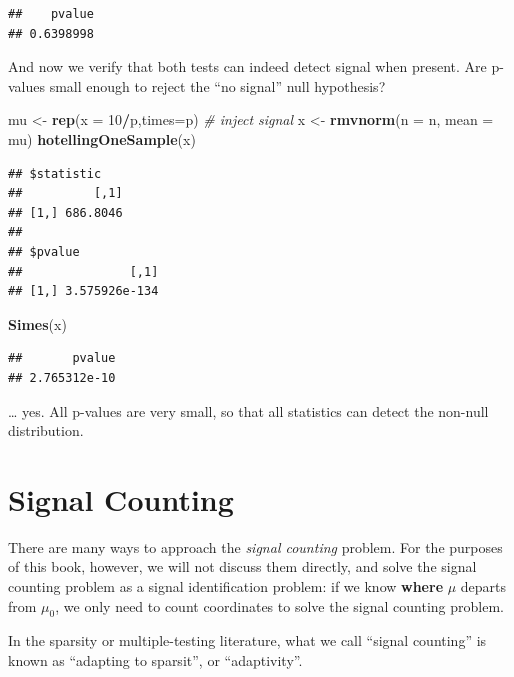 \documentclass[]{book}
\newenvironment{Shaded}{\begin{snugshade}}{\end{snugshade}}
\newcommand{\KeywordTok}[1]{\textcolor[rgb]{0.13,0.29,0.53}{\textbf{#1}}}
\newcommand{\DataTypeTok}[1]{\textcolor[rgb]{0.13,0.29,0.53}{#1}}
\newcommand{\DecValTok}[1]{\textcolor[rgb]{0.00,0.00,0.81}{#1}}
\newcommand{\StringTok}[1]{\textcolor[rgb]{0.31,0.60,0.02}{#1}}
\newcommand{\CommentTok}[1]{\textcolor[rgb]{0.56,0.35,0.01}{\textit{#1}}}
\newcommand{\OperatorTok}[1]{\textcolor[rgb]{0.81,0.36,0.00}{\textbf{#1}}}
\newcommand{\NormalTok}[1]{#1}
\theoremstyle{definition}
\theoremstyle{definition}
\theoremstyle{definition}
\theoremstyle{remark}
\let\BeginKnitrBlock\begin \let\EndKnitrBlock\end
\begin{document}
\begin{verbatim}
##    pvalue 
## 0.6398998
\end{verbatim}

And now we verify that both tests can indeed detect signal when present.
Are p-values small enough to reject the ``no signal'' null hypothesis?

\begin{Shaded}
\begin{Highlighting}[]
\NormalTok{mu <-}\StringTok{ }\KeywordTok{rep}\NormalTok{(}\DataTypeTok{x =} \DecValTok{10}\OperatorTok{/}\NormalTok{p,}\DataTypeTok{times=}\NormalTok{p) }\CommentTok{# inject signal}
\NormalTok{x <-}\StringTok{ }\KeywordTok{rmvnorm}\NormalTok{(}\DataTypeTok{n =}\NormalTok{ n, }\DataTypeTok{mean =}\NormalTok{ mu)}
\KeywordTok{hotellingOneSample}\NormalTok{(x)}
\end{Highlighting}
\end{Shaded}

\begin{verbatim}
## $statistic
##          [,1]
## [1,] 686.8046
## 
## $pvalue
##               [,1]
## [1,] 3.575926e-134
\end{verbatim}

\begin{Shaded}
\begin{Highlighting}[]
\KeywordTok{Simes}\NormalTok{(x)}
\end{Highlighting}
\end{Shaded}

\begin{verbatim}
##       pvalue 
## 2.765312e-10
\end{verbatim}

\ldots{} yes. All p-values are very small, so that all statistics can
detect the non-null distribution.

\section{Signal Counting}\label{signal-counting}

There are many ways to approach the \emph{signal counting} problem. For
the purposes of this book, however, we will not discuss them directly,
and solve the signal counting problem as a signal identification
problem: if we know \textbf{where} \(\mu\) departs from \(\mu_0\), we
only need to count coordinates to solve the signal counting problem.

\BeginKnitrBlock{remark}
{}In the sparsity or multiple-testing
literature, what we call ``signal counting'' is known as ``adapting to
sparsit'', or ``adaptivity''.
\EndKnitrBlock{remark}
\end{document}
